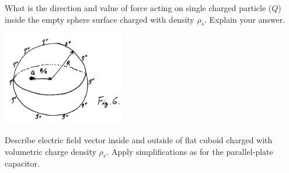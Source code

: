 \begin{Exercise}[difficulty=3]
What is the direction and value of force acting on single charged particle ($Q$) inside the empty sphere surface charged with density $\rho_s$. Explain your answer.
\begin{center}
\includegraphics[width=0.4\textwidth]{img/fig_e6.png} 
\end{center}
\end{Exercise}

\begin{Exercise}[difficulty=3]
Describe electric field vector inside and outside of flat cuboid charged with volumetric charge density $\rho_v$. Apply simplifications as for the parallel-plate capacitor. 
\end{Exercise}


